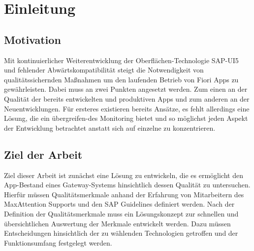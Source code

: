 \chapter{Einleitung}

\section{Motivation}

Mit kontinuierlicher Weiterentwicklung der Oberflächen-Technologie SAP-UI5 und fehlender Abwärtskompatibilität steigt die Notwendigkeit von qualitätssichernden Maßnahmen um den laufenden Betrieb von Fiori Apps zu gewährleisten.
Dabei muss an zwei Punkten angesetzt werden. Zum einen an der Qualität der bereits entwickelten und produktiven Apps und zum anderen an der Neuentwicklungen.
Für ersteres existieren bereits Ansätze, es fehlt allerdings eine Lösung, die ein übergreifen-des Monitoring bietet und so möglichst jeden Aspekt der Entwicklung betrachtet anstatt sich auf einzelne zu konzentrieren.

\section{Ziel der Arbeit}

Ziel dieser Arbeit ist zunächst eine Lösung zu entwickeln, die es ermöglicht den App-Bestand eines Gateway-Systems hinsichtlich dessen Qualität zu untersuchen. Hierfür müssen Qualitätsmerkmale anhand der Erfahrung von Mitarbeitern des MaxAttention Supports und den SAP Guidelines definiert werden. 
Nach der Definition der Qualitätsmerkmale muss ein Lösungskonzept zur schnellen und übersichtlichen Auswertung der Merkmale entwickelt werden. Dazu müssen Entscheidungen hinsichtlich der zu wählenden Technologien getroffen und der Funktionsumfang festgelegt werden.

